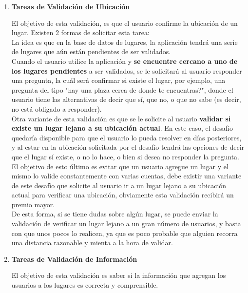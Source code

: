 \documentclass[10pt,letterpaper]{article}
\begin{document}
\begin{enumerate}
\item \textbf{Tareas de Validación de Ubicación}

El objetivo de esta validación, es que el usuario confirme la ubicación de un lugar. Existen 2 formas de solicitar esta tarea:\\

La idea es que en la base de datos de lugares, la aplicación tendrá una serie de lugares que aún están pendientes de ser validados.\\

Cuando el usuario utilice la aplicación y \textbf{se encuentre cercano a uno de los lugares pendientes} a ser validados, se le solicitará al usuario responder una pregunta, la cuál será confirmar si existe el lugar, por ejemplo, una pregunta del tipo "hay una plaza cerca de donde te encuentras?", donde el usuario tiene las alternativas de decir que sí, que no, o que no sabe (es decir, no está obligado a responder).\\

Otra variante de esta validación es que se le solicite al usuario \textbf{validar si existe un lugar lejano a su ubicación actual}. En este caso, el desafío quedaría disponible para que el usuario lo pueda resolver en días posteriores, y al estar en la ubicación solicitada por el desafío tendrá las opciones de decir que el lugar sí existe, o no lo hace, o bien si desea no responder la pregunta.\\

El objetivo de esto último es evitar que un usuario agregue un lugar y el mismo lo valide constantemente con varias cuentas, debe existir una variante de este desafío que solicite al usuario ir a un lugar lejano a su ubicación actual para verificar una ubicación, obviamente esta validación recibirá un premio mayor.\\

De esta forma, si se tiene dudas sobre algún lugar, se puede enviar la validación de verificar un lugar lejano a un gran número de usuarios, y basta con que unos pocos lo realicen, ya que es poco probable que alguien recorra una distancia razonable y mienta a la hora de validar.\\

\item \textbf{Tareas de Validación de Información}

El objetivo de esta validación es saber si la información que agregan los usuarios a los lugares es correcta y comprensible.\\


\end{enumerate}
\end{document}
